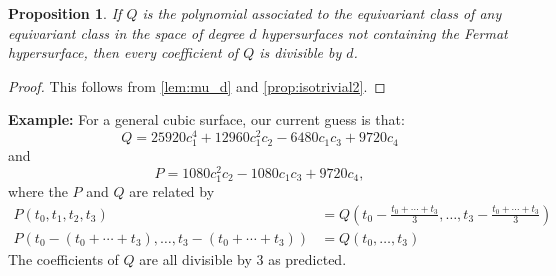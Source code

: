 \documentclass[12 pt]{amsart}
\newtheorem{proposition}{Proposition}[section]
\newenvironment{example}{\textbf{Example:}}{}
\newcommand{\<}{\left\langle}
\renewcommand{\>}{\right\rangle}
\begin{document}
\begin{proposition}
\label{prop:divd}
If $Q$ is the polynomial associated to the equivariant class of \emph{any} equivariant class in the space of degree $d$ hypersurfaces not containing the Fermat hypersurface, then every coefficient of $Q$ is divisible by $d$.
\end{proposition}

\begin{proof}
This follows from \autoref{lem:mu_d} and \autoref{prop:isotrivial2}.
\end{proof}

\begin{example}
For a general cubic surface, our current guess is that:
$$Q = 25920 c_1^4+12960 c_1^2 c_2-6480 c_1 c_3+9720 c_4$$
 and
$$P = 1080 c_1^2 c_2-1080 c_1 c_3+9720 c_4,$$
where the $P$ and $Q$ are related by
\begin{align*}
P(t_0,t_1,t_2,t_3) &= Q(t_0 - \frac{t_0+\cdots+t_3}{3},\ldots, t_3 - \frac{t_0+\cdots+t_3}{3})\\
P(t_0 - (t_0+\cdots+t_3), \ldots, t_3 - (t_0+\cdots+t_3)) &= Q(t_0,\ldots,t_3)
\end{align*}
The coefficients of $Q$  are all divisible by 3 as predicted.
\end{example}


\end{document}
